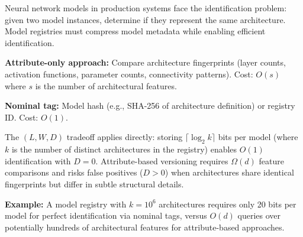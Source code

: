 Neural network models in production systems face the identification problem: given two model instances, determine if they represent the same architecture. Model registries must compress model metadata while enabling efficient identification.

\textbf{Attribute-only approach:} Compare architecture fingerprints (layer counts, activation functions, parameter counts, connectivity patterns). Cost: $O(s)$ where $s$ is the number of architectural features.

\textbf{Nominal tag:} Model hash (e.g., SHA-256 of architecture definition) or registry ID. Cost: $O(1)$.

The $(L, W, D)$ tradeoff applies directly: storing $\lceil \log_2 k \rceil$ bits per model (where $k$ is the number of distinct architectures in the registry) enables $O(1)$ identification with $D = 0$. Attribute-based versioning requires $\Omega(d)$ feature comparisons and risks false positives ($D > 0$) when architectures share identical fingerprints but differ in subtle structural details.

\textbf{Example:} A model registry with $k = 10^6$ architectures requires only 20 bits per model for perfect identification via nominal tags, versus $O(d)$ queries over potentially hundreds of architectural features for attribute-based approaches.
